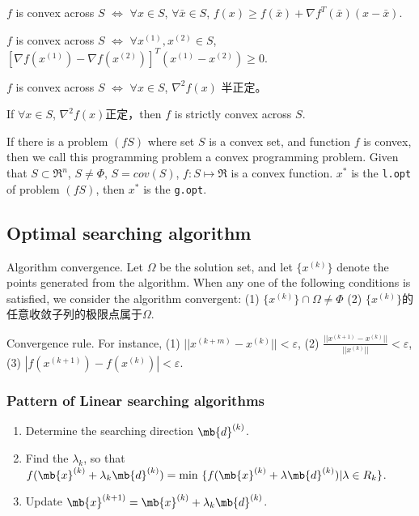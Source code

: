 $f$ is convex across $S$ $\Leftrightarrow$ $\forall x\in S$,
$\forall \bar{x}\in S$, $f(x)\geqslant f(\bar{x}) + \nabla f^T(\bar{x})
 (x-\bar{x})$.

$f$ is convex across $S$ $\Leftrightarrow$ $\forall x^{(1)}, x^{(2)} \in S$,
$[\nabla f(x^{(1)}) - \nabla f(x^{(2)}) ]^T (x^{(1)} - x^{(2)}) \geqslant 0 $.

$f$ is convex across $S$ $\Leftrightarrow$ $\forall x \in S$, $\nabla^2 f(x)$ 半正定。

If $\forall x \in S$, $\nabla^2 f(x)$正定，then $f$ is strictly convex across $S$.

If there is a problem $(fS)$ where set $S$ is a convex set, and function
$f$ is convex, then we call this programming problem a convex programming
problem. Given that $S\subset \Re^n$, $S\neq\Phi$, $S=cov(S)$,
$f:S\mapsto\Re$ is a convex function. $x^*$ is the \verb|l.opt| of problem
$(fS)$, then $x^*$ is the \verb|g.opt|.


\subsection{Optimal searching algorithm}

Algorithm convergence. Let $\Omega$ be the solution set, and let $\{ x^{(k)} \}$
denote the points generated from the algorithm. When any one of the following
conditions is satisfied, we consider the algorithm convergent:
(1) $\{ x^{(k)} \} \cap \Omega \neq \Phi$ (2) $\{ x^{(k)} \}$的任意收敛子列的极限点属于$\Omega$.

Convergence rule. For instance, (1) $|| x^{(k+m)} - x^{(k)} || < \varepsilon$,
(2) $\frac{||x^{(k+1)} - x^{(k)}||}{||x^{(k)}||} < \varepsilon$,
(3) $| f(x^{(k+1)}) - f(x^{(k)}) | < \varepsilon$.

 \subsubsection{Pattern of Linear searching algorithms}

\begin{enumerate}
 \item Determine the searching direction $\mb{d}^{(k)}$.
 \item Find the $\lambda_k$, so that $f(\mb{x}^{(k)} +\lambda_k \mb{d}^{(k)}) = 
       \text{min } \{ f(\mb{x}^{(k)} +\lambda \mb{d}^{(k)}) | \lambda \in R_k \}$.
 \item Update $\mb{x}^{(k+1)} = \mb{x}^{(k)} + \lambda_k \mb{d}^{(k)}$.
\end{enumerate}

